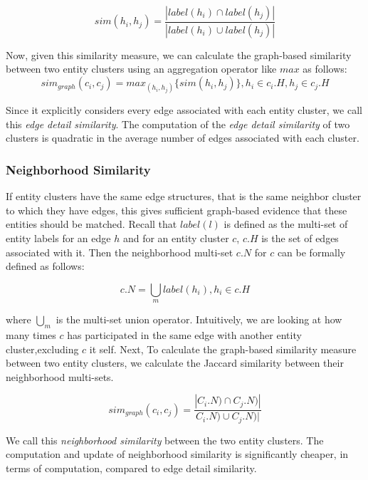 $$sim(h_i,h_j)=\frac{|label(h_i)\cap label(h_j)|}{|label(h_i)\cup label(h_j)|}$$

Now, given this similarity measure, we can calculate the graph-based similarity between two entity clusters using an aggregation operator like $max$ as follows:
$$sim_{graph}(c_i,c_j)=max_{(h_i,h_j)}\{sim(h_i,h_j)\}, h_i \in c_i.H,h_j \in c_j.H$$

Since it explicitly considers every edge associated with each entity cluster, we call this \textit{edge detail similarity}. The computation of the  \textit{edge detail similarity} of two clusters is quadratic in the average number of edges associated with each cluster.
 
\subsubsection{Neighborhood Similarity}
If entity clusters have the same edge structures, that is the same neighbor cluster to which they have edges, this gives sufficient graph-based evidence that these entities should be matched.
Recall that $label(l)$ is defined as the multi-set of entity labels for an edge $h$ and for an entity cluster $c$, $c.H$ is the set of edges associated with it. Then the neighborhood multi-set $c.N$ for $c$ can be formally defined as follows:

$$c.N=\bigcup_m {label(h_i)},h_i \in c.H$$
   
where $\bigcup_m$ is the multi-set union operator. Intuitively, we are looking at how many times $c$ has participated in the same edge with another entity cluster,excluding $c$ it self. Next, To calculate the graph-based similarity measure between two entity clusters, we calculate the Jaccard similarity between their neighborhood multi-sets.

$$sim_{graph}(c_i,c_j)=\frac{|C_i.N)\cap C_j.N)|}{C_i.N)\cup C_j.N)|}$$

We call this \textit{neighborhood similarity} between the two entity clusters. The computation and update of neighborhood similarity is significantly cheaper, in terms of computation, compared to edge detail similarity.

